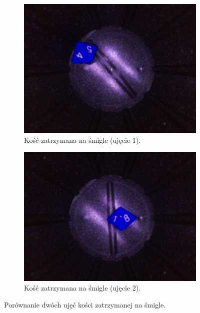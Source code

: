 \begin{figure}[H]
    \centering
    \begin{subfigure}[t]{0.45\linewidth}
        \centering
        \includegraphics[width=\linewidth]{chapters/04-czytanie/figures/niepewne}
        \caption{Kość zatrzymana na śmigle (ujęcie 1).}
        \label{fig:niepewne}
    \end{subfigure}
    \hfill
    \begin{subfigure}[t]{0.45\linewidth}
        \centering
        \includegraphics[width=\linewidth]{chapters/04-czytanie/figures/smiglo}
        \caption{Kość zatrzymana na śmigle (ujęcie 2).}
        \label{fig:smiglo}
    \end{subfigure}
    \caption{Porównanie dwóch ujęć kości zatrzymanej na śmigle.}
    \label{fig:smiglocombined}
\end{figure}


